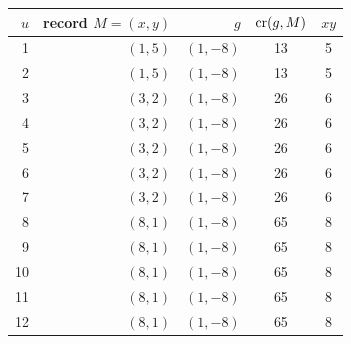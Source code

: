 \begin{tabular}{@{}rrrcc@{}}
\toprule $u$ & record $M=(x,y)$ & $g$ & $\operatorname{cr}(g,M)$ & $xy$\\\midrule
1 & $(1,5)$ & $(1,-8)$ & 13 & 5\\
2 & $(1,5)$ & $(1,-8)$ & 13 & 5\\
3 & $(3,2)$ & $(1,-8)$ & 26 & 6\\
4 & $(3,2)$ & $(1,-8)$ & 26 & 6\\
5 & $(3,2)$ & $(1,-8)$ & 26 & 6\\
6 & $(3,2)$ & $(1,-8)$ & 26 & 6\\
7 & $(3,2)$ & $(1,-8)$ & 26 & 6\\
8 & $(8,1)$ & $(1,-8)$ & 65 & 8\\
9 & $(8,1)$ & $(1,-8)$ & 65 & 8\\
10 & $(8,1)$ & $(1,-8)$ & 65 & 8\\
11 & $(8,1)$ & $(1,-8)$ & 65 & 8\\
12 & $(8,1)$ & $(1,-8)$ & 65 & 8\\
\bottomrule\end{tabular}